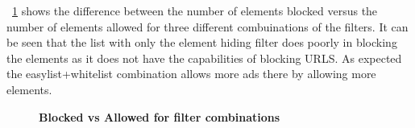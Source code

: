 ~\ref{fig:block-allow} shows the difference between the number of  elements  blocked  versus the number of elements allowed for three different  combuinations of the filters.
It can be seen that the list with only the element hiding filter does poorly in blocking the  elements as it does not have the capabilities of blocking URLS.
As expected the easylist+whitelist combination allows more ads there by allowing more elements.
\begin{figure}
	\centering
	\vspace*{-0.5cm}
	\caption{\textbf{Blocked vs Allowed for filter combinations}}
	\label{fig:block-allow}
	\vspace*{-0.5cm}
\end{figure}